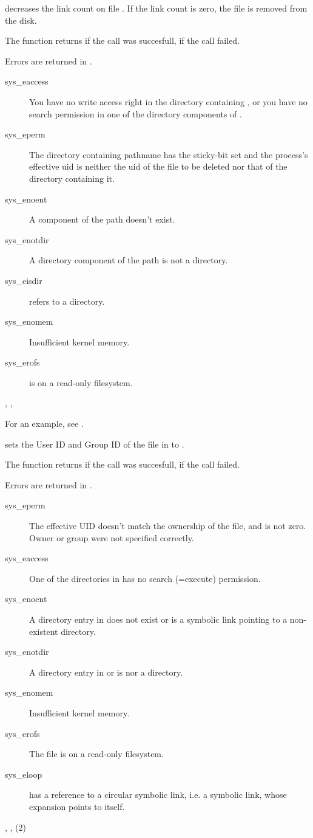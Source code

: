 {
 decreases the link count on file . If the link count is zero, the
file is removed from the disk.

The function returns  if the call was succesfull,  if the call
failed.
}
{ Errors are returned in .
\begin{description}
\item[sys\_eaccess] You have no write access right in the directory
containing , or you have no search permission in one of the
directory components of .
\item[sys\_eperm] The  directory containing pathname has the sticky-bit 
set and the process's effective  uid is neither the uid of the 
file to be deleted nor that of the directory containing it.
\item[sys\_enoent] A component of the path doesn't exist.
\item[sys\_enotdir] A directory component of the path is not a directory.
\item[sys\_eisdir]  refers to a directory.
\item[sys\_enomem] Insufficient kernel memory.
\item[sys\_erofs]  is on a read-only filesystem. 
\end{description}
}
{, ,  }

For an example, see .

{  sets the User ID and Group ID of the file in  to .

The function returns  if the call was succesfull,  if the call
failed.
}
{
Errors are returned in .
\begin{description}
\item[sys\_eperm] The effective UID doesn't match the ownership of the file,
and is not zero. Owner or group were not specified correctly.
\item[sys\_eaccess] One of the directories in  has no
search (=execute) permission.
\item[sys\_enoent] A directory entry in  does
not exist or is a symbolic link pointing to a non-existent directory.
\item[sys\_enotdir] A directory entry in  or  is
nor a directory.
\item[sys\_enomem] Insufficient kernel memory.
\item[sys\_erofs] The file is on a read-only filesystem.
\item[sys\_eloop]  has a reference to a circular
symbolic link, i.e. a symbolic link, whose expansion points to itself.
\end{description}
}
{, , (2)}

